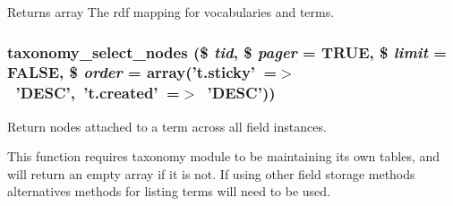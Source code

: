 \begin{DoxyReturn}{Returns}
array The rdf mapping for vocabularies and terms. 
\end{DoxyReturn}
\hypertarget{taxonomy_8module_af8fa429d60d3978bce025539b018b95f}{
\subsubsection[{taxonomy\_\-select\_\-nodes}]{\setlength{\rightskip}{0pt plus 5cm}taxonomy\_\-select\_\-nodes (\$ {\em tid}, \/  \$ {\em pager} = {\ttfamily TRUE}, \/  \$ {\em limit} = {\ttfamily FALSE}, \/  \$ {\em order} = {\ttfamily array('t.sticky'~=$>$~'DESC',~'t.created'~=$>$~'DESC')})}}
\label{taxonomy_8module_af8fa429d60d3978bce025539b018b95f}
Return nodes attached to a term across all field instances.

This function requires taxonomy module to be maintaining its own tables, and will return an empty array if it is not. If using other field storage methods alternatives methods for listing terms will need to be used.


